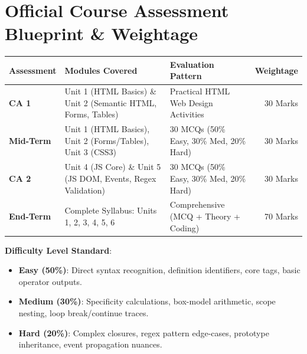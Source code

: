 \section*{Official Course Assessment Blueprint \& Weightage}

\begin{tcolorbox}[enhanced,colback=white,colframe=CSCyan,arc=2mm,title=\textbf{Assessment Architecture \& Module Mapping}]
\begin{tabularx}{\textwidth}{l X l r}
\toprule
\textbf{Assessment} & \textbf{Modules Covered} & \textbf{Evaluation Pattern} & \textbf{Weightage} \\
\midrule
\textbf{CA 1} & Unit 1 (HTML Basics) \& Unit 2 (Semantic HTML, Forms, Tables) & Practical HTML Web Design Activities & 30 Marks \\
\textbf{Mid-Term} & Unit 1 (HTML Basics), Unit 2 (Forms/Tables), Unit 3 (CSS3) & 30 MCQs (50\% Easy, 30\% Med, 20\% Hard) & 30 Marks \\
\textbf{CA 2} & Unit 4 (JS Core) \& Unit 5 (JS DOM, Events, Regex Validation) & 30 MCQs (50\% Easy, 30\% Med, 20\% Hard) & 30 Marks \\
\textbf{End-Term} & Complete Syllabus: Units 1, 2, 3, 4, 5, 6 & Comprehensive (MCQ + Theory + Coding) & 70 Marks \\
\bottomrule
\end{tabularx}
\end{tcolorbox}

\vspace{5mm}
\noindent
\textbf{Difficulty Level Standard}:
\begin{itemize}[leftmargin=8mm]
  \item \textbf{Easy (50\%)}: Direct syntax recognition, definition identifiers, core tags, basic operator outputs.
  \item \textbf{Medium (30\%)}: Specificity calculations, box-model arithmetic, scope nesting, loop break/continue traces.
  \item \textbf{Hard (20\%)}: Complex closures, regex pattern edge-cases, prototype inheritance, event propagation nuances.
\end{itemize}
\newpage
